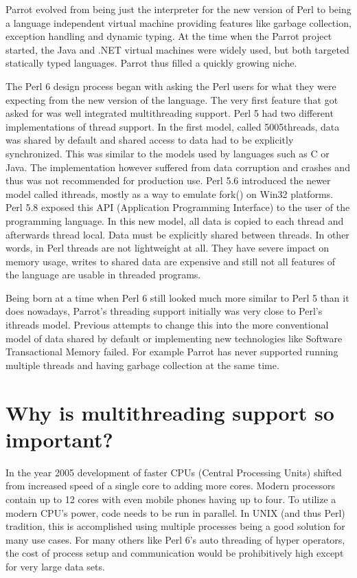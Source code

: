 \documentclass[bachelor,english]{hgbthesis}
\begin{document}
Parrot evolved from being just the interpreter for the new version of Perl to being a language independent virtual machine providing features like garbage collection, exception handling and dynamic typing. At the time when the Parrot project started, the Java and .NET virtual machines were widely used, but both targeted statically typed languages. Parrot thus filled a quickly growing niche.

The Perl 6 design process began with asking the Perl users for what they were expecting from the new version of the language. The very first feature that got asked for was well integrated multithreading support\cite{RFC1}. Perl 5 had two different implementations of thread support. In the first model, called 5005threads, data was shared by default and shared access to data had to be explicitly synchronized. This was similar to the models used by languages such as C or Java. The implementation however suffered from data corruption and crashes and thus was not recommended for production use\cite{ThreadManual}. Perl 5.6 introduced the newer model called ithreads, mostly as a way to emulate fork() on Win32 platforms. Perl 5.8 exposed this API (Application Programming Interface) to the user of the programming language. In this new model, all data is copied to each thread and afterwards thread local. Data must be explicitly shared between threads. In other words, in Perl threads are not lightweight at all. They have severe impact on memory usage, writes to shared data are expensive and still not all features of the language are usable in threaded programs.

Being born at a time when Perl 6 still looked much more similar to Perl 5 than it does nowadays, Parrot's threading support initially was very close to Perl's ithreads model. Previous attempts to change this into the more conventional model of data shared by default or implementing new technologies like Software Transactional Memory failed. For example Parrot has never supported running multiple threads and having garbage collection at the same time.

\section{Why is multithreading support so important?}

In the year 2005 development of faster CPUs (Central Processing Units) shifted from increased speed of a single core to adding more cores. Modern processors contain up to 12 cores with even mobile phones having up to four. To utilize a modern CPU's power, code needs to be run in parallel. In UNIX (and thus Perl) tradition, this is accomplished using multiple processes being a good solution for many use cases. For many others like Perl 6's auto threading of hyper operators, the cost of process setup and communication would be prohibitively high except for very large data sets.
\end{document}

